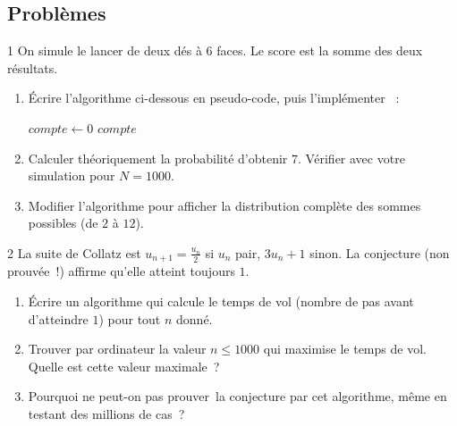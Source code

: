 \subsection*{Probl\`emes}

\begin{probleme}{1}
On simule le lancer de deux d\'es \`a 6 faces.
Le score est la somme des deux r\'esultats.
\begin{enumerate}
  \item \'Ecrire l'algorithme ci-dessous en pseudo-code, puis
        l'impl\'ementer \computer~:

\begin{algorithm}[H]
\caption{Simulation de $N$ lancers de d\'es}
$\mathit{compte} \leftarrow 0$\;
\Afficher $\mathit{compte}$\;
\end{algorithm}

  \item Calculer th\'eoriquement la probabilit\'e d'obtenir $7$.
        V\'erifier avec votre simulation pour $N = 1000$.
  \item Modifier l'algorithme pour afficher la distribution compl\`ete
        des sommes possibles (de $2$ \`a $12$).
\end{enumerate}
\end{probleme}

\begin{probleme}{2}
La suite de Collatz est $u_{n+1} = \frac{u_n}{2}$ si $u_n$ pair,
$3u_n + 1$ sinon. La conjecture (non prouv\'ee~!) affirme qu'elle
atteint toujours $1$.
\begin{enumerate}
  \item \'Ecrire un algorithme qui calcule le temps de vol
        (nombre de pas avant d'atteindre $1$) pour tout $n$ donn\'e.
  \item Trouver par ordinateur la valeur $n \leq 1000$ qui maximise
        le temps de vol. Quelle est cette valeur maximale~?
  \item Pourquoi ne peut-on pas \og prouver\fg\ la conjecture
        par cet algorithme, m\^eme en testant des millions de cas~?
\end{enumerate}
\end{probleme}

